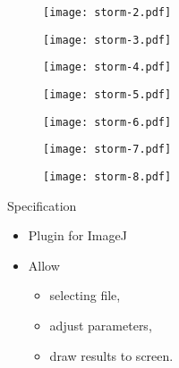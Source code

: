 \documentclass{beamer}
\begin{document}
\begin{frame}
	\begin{figure}
		\texttt{[image: storm-2.pdf]}
	\end{figure}
\end{frame}

\begin{frame}
	\begin{figure}
		\texttt{[image: storm-3.pdf]}
	\end{figure}
\end{frame}

\begin{frame}
	\begin{figure}
		\texttt{[image: storm-4.pdf]}
	\end{figure}
\end{frame}

\begin{frame}
	\begin{figure}
		\texttt{[image: storm-5.pdf]}
	\end{figure}
\end{frame}

\begin{frame}
	\begin{figure}
		\texttt{[image: storm-6.pdf]}
	\end{figure}
\end{frame}

\begin{frame}
	\begin{figure}
		\texttt{[image: storm-7.pdf]}
	\end{figure}
\end{frame}

\begin{frame}
	\begin{figure}
		\texttt{[image: storm-8.pdf]}
	\end{figure}
\end{frame}

\begin{frame}{Specification}
	\begin{itemize}
		\item Plugin for ImageJ
		\item Allow
			\begin{itemize}
				\item selecting file,
				\item adjust parameters,
				\item draw results to screen.
			\end{itemize}
	\end{itemize}

\end{frame}
\end{document}

